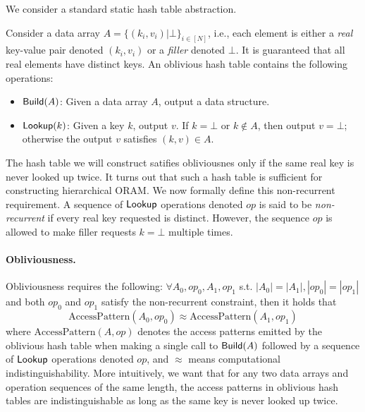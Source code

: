 We consider a standard static hash table abstraction.
\begin{definition}
    Consider a data array $A = \{ (k_i, v_i) | \bot \}_{i \in [N]}$, i.e., 
each element is either a {\it real} key-value pair denoted $(k_i, v_i)$ 
or a {\it filler} denoted $\bot$. It is guaranteed that all real elements have distinct keys. An oblivious hash table contains the following operations:
    \begin{itemize}
      \item ${\sf Build}(A)$: Given a data array $A$, output a data structure.
      \item ${\sf Lookup}(k)$: Given a key $k$, output $v$. If $k = \bot$ or $k \notin A$, then output 
$v = \bot$; otherwise the output $v$ satisfies 
$(k, v) \in A$. 
    \end{itemize}

The hash table 
we will construct satifies
obliviousnes only if the same real key
is never looked up twice. 
It turns out that such a hash table 
is sufficient for constructing hierarchical ORAM.
We now formally define this non-recurrent requirement. 
A sequence of ${\sf Lookup}$ operations denoted $op$
is said to be {\it non-recurrent} if 
every real key requested is distinct. However, the sequence  
$op$ is allowed to make filler requests $k = \bot$ multiple times. 

\paragraph{Obliviousness.} Obliviousness requires the following: 
    $\forall A_0, op_0, A_1, op_1$ s.t. $|A_0| = |A_1|, |op_0| = |op_1|$ and both $op_0$ and $op_1$ satisfy the non-recurrent constraint, 
then %
it holds that 
    $$\text{AccessPattern}(A_0, op_0) \approx \text{AccessPattern}(A_1, op_1)$$
where $\text{AccessPattern}(A, op)$ denotes
the access patterns emitted
by the oblivious hash table 
when making a single call to ${\sf Build}(A)$
followed by a sequence of ${\sf Lookup}$ operations denoted $op$, 
and $\approx$ means computational indistinguishability.
More intuitively, 
we want that for any two data arrays and operation sequences of the same length, 
the access patterns in oblivious hash tables are indistinguishable as long as the same key is never looked up twice.
\end{definition}

